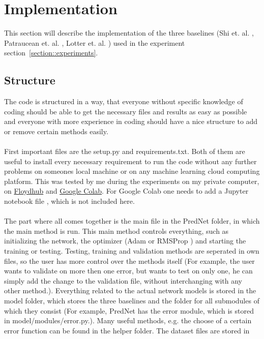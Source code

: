 \section{Implementation} \label{section::implementation}
 This section will describe the implementation of the three baselines (Shi et. al. \cite{Shi2015}, Patraucean et. al. \cite{Patraucean2015}, Lotter et. al. 
 \cite{Lotter2016}) used in the experiment section~\ref{section::experiments}.
  
 \subsection{Structure} \label{subsection::structure}
  The code is structured in a way, that everyone without specific knowledge of coding should be able to get the necessary files and results as easy as possible and
  everyone with more experience in coding should have a nice structure to add or remove certain methods easily.\\\\
  First important files are the setup.py and requirements.txt. Both of them are useful to install every necessary requirement to run the code without any further
  problems on someones local machine or on any machine learning cloud computing platform. This was tested by me during the experiments on my private computer, on 
  \href{www.floydhub.com} {Floydhub} and \href{colab.research.google.com}{Google Colab}.
  For Google Colab one needs to add a Jupyter notebook file \cite{Kluyver2016}, which is not included here.\\\\
  The part where all comes together is the main file in the PredNet folder, in which the main method is run. This main method controls everything, such as 
  initializing the network,
  the optimizer (Adam \cite{Kingma2015} or RMSProp \cite{Ruder2016}) and starting the training or testing. Testing, training and validation methods are seperated 
  in own files, so the user has more 
  control over the methods itself (For example, the user wants to validate on more then one error, but wants to test on only one, he can simply
  add the change to the validation file, without interchanging with any other method.). Everything related to the actual network models is stored in the model 
  folder, which stores the three baselines and the folder for all submodules of which they consist (For example, PredNet has the error module, which is stored in 
  model/modules/error.py.). Many useful methods, e.g. the choose of a certain error function can be found in the helper folder. The dataset files are stored in 
